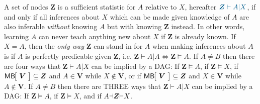  A set of nodes $\bm{Z}$ is a sufficient statistic for $A$ relative to $X$, hereafter $\mblue{\bm{Z}\vdash A|X}$,
if and only if all inferences about $X$ which can be made given knowledge of $A$ are also inferable \emph{without} knowing $A$ but with knowing $\bm{Z}$ instead. In other words, learning $A$ can never teach anything new about $X$ if $\bm{Z}$ is already known. If $X=A$, then the \emph{only way} $\bm{Z}$ can stand in for $A$ when making inferences about $A$ is if $A$ is perfectly predicable given $\bm{Z}$, i.e. ${\bm{Z}\vdash A|A\iff \bm{Z}\vDash A}$. If $A\neq B$ then there are four  ways that $\bm{Z}\vdash A|X$ can be implied by a DAG: If $\bm{Z}\vDash A$, if $\bm{Z}\vDash X$, if $\NamedFunction{MB}{\!\bm{V}\!}\subseteq \bm{Z}$ and $A\in \bm{V}$ while $X\not\in \bm{V}$, or if $\NamedFunction{MB}{\!\bm{V}\!}\subseteq \bm{Z}$ and $X\in \bm{V}$ while $A\not\in \bm{V}$.  If $A\neq B$ then there are THREE ways that $\bm{Z}\vdash A|X$ can be implied by a DAG: If $\bm{Z}\vDash A$, if $\bm{Z}\vDash X$, and if ${A\mathord{\dashv}\bm{Z}\mathord{\vdash}X}$.






